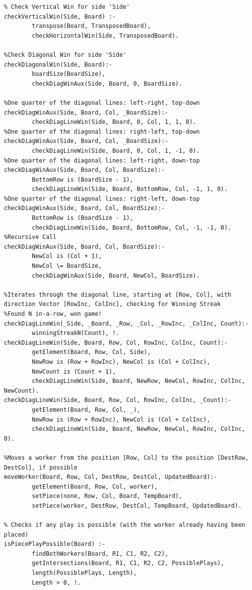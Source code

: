 \documentclass[a4paper]{article}
\begin{document}
\begin{lstlisting}
% Check Vertical Win for side 'Side'
checkVerticalWin(Side, Board) :-
        transpose(Board, TransposedBoard),
        checkHorizontalWin(Side, TransposedBoard).

%Check Diagonal Win for side 'Side'
checkDiagonalWin(Side, Board):-
        boardSize(BoardSize),
        checkDiagWinAux(Side, Board, 0, BoardSize).

%One quarter of the diagonal lines: left-right, top-down
checkDiagWinAux(Side, Board, Col, _BoardSize):-
        checkDiagLineWin(Side, Board, 0, Col, 1, 1, 0).
%One quarter of the diagonal lines: right-left, top-down
checkDiagWinAux(Side, Board, Col, _BoardSize):-
        checkDiagLineWin(Side, Board, 0, Col, 1, -1, 0).
%One quarter of the diagonal lines: left-right, down-top
checkDiagWinAux(Side, Board, Col, BoardSize):-
        BottomRow is (BoardSize - 1),
        checkDiagLineWin(Side, Board, BottomRow, Col, -1, 1, 0).
%One quarter of the diagonal lines: right-left, down-top
checkDiagWinAux(Side, Board, Col, BoardSize):-
        BottomRow is (BoardSize - 1),
        checkDiagLineWin(Side, Board, BottomRow, Col, -1, -1, 0).
%Recursive Call
checkDiagWinAux(Side, Board, Col, BoardSize):-
        NewCol is (Col + 1),
        NewCol \= BoardSize,
        checkDiagWinAux(Side, Board, NewCol, BoardSize).

%Iterates through the diagonal line, starting at [Row, Col], with direction Vector [RowInc, ColInc], checking for Winning Streak
%Found N in-a-row, won game!
checkDiagLineWin(_Side, _Board, _Row, _Col, _RowInc, _ColInc, Count):-
        winningStreakN(Count), !.
checkDiagLineWin(Side, Board, Row, Col, RowInc, ColInc, Count):-
        getElement(Board, Row, Col, Side),
        NewRow is (Row + RowInc), NewCol is (Col + ColInc),
        NewCount is (Count + 1),
        checkDiagLineWin(Side, Board, NewRow, NewCol, RowInc, ColInc, NewCount).
checkDiagLineWin(Side, Board, Row, Col, RowInc, ColInc, _Count):-
        getElement(Board, Row, Col, _),
        NewRow is (Row + RowInc), NewCol is (Col + ColInc),
        checkDiagLineWin(Side, Board, NewRow, NewCol, RowInc, ColInc, 0).

%Moves a worker from the position [Row, Col] to the position [DestRow, DestCol], if possible
moveWorker(Board, Row, Col, DestRow, DestCol, UpdatedBoard):-
        getElement(Board, Row, Col, worker),
        setPiece(none, Row, Col, Board, TempBoard),
        setPiece(worker, DestRow, DestCol, TempBoard, UpdatedBoard).

% Checks if any play is possible (with the worker already having been placed)
isPiecePlayPossible(Board) :-
        findBothWorkers(Board, R1, C1, R2, C2),
        getIntersections(Board, R1, C1, R2, C2, PossiblePlays),
        length(PossiblePlays, Length),
        Length > 0, !.
\end{lstlisting}
\newpage
\end{document}
